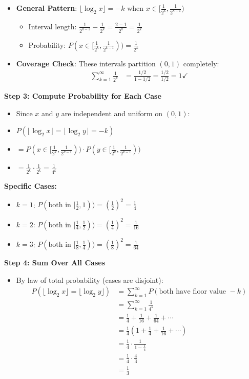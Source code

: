 \documentclass[11pt]{article}
\begin{document}
\begin{solutionbox}
\begin{itemize}
    \item \textbf{General Pattern}: $\lfloor\log_2 x\rfloor = -k$ when $x \in [\frac{1}{2^k}, \frac{1}{2^{k-1}})$ 
    \begin{itemize}
        \item Interval length: $\frac{1}{2^{k-1}} - \frac{1}{2^k} = \frac{2 - 1}{2^k} = \frac{1}{2^k}$
        \item Probability: $P(x \in [\frac{1}{2^k}, \frac{1}{2^{k-1}})) = \frac{1}{2^k}$
    \end{itemize}
    
    \item \textbf{Coverage Check}: These intervals partition $(0,1)$ completely:
    \begin{align*}
    \sum_{k=1}^{\infty} \frac{1}{2^k} &= \frac{1/2}{1-1/2} = \frac{1/2}{1/2} = 1 \checkmark
    \end{align*}
\end{itemize}

\textbf{Step 3: Compute Probability for Each Case}
\begin{itemize}
    \item Since $x$ and $y$ are independent and uniform on $(0,1)$:
    \item $P(\lfloor\log_2 x\rfloor = \lfloor\log_2 y\rfloor = -k)$
    \item $= P(x \in [\frac{1}{2^k}, \frac{1}{2^{k-1}})) \cdot P(y \in [\frac{1}{2^k}, \frac{1}{2^{k-1}}))$
    \item $= \frac{1}{2^k} \cdot \frac{1}{2^k} = \frac{1}{4^k}$
\end{itemize}

\textbf{Specific Cases:}
\begin{itemize}
    \item $k=1$: $P(\text{both in } [\frac{1}{2}, 1)) = (\frac{1}{2})^2 = \frac{1}{4}$
    \item $k=2$: $P(\text{both in } [\frac{1}{4}, \frac{1}{2})) = (\frac{1}{4})^2 = \frac{1}{16}$
    \item $k=3$: $P(\text{both in } [\frac{1}{8}, \frac{1}{4})) = (\frac{1}{8})^2 = \frac{1}{64}$
\end{itemize}

\textbf{Step 4: Sum Over All Cases}
\begin{itemize}
    \item By law of total probability (cases are disjoint):
    \begin{align*}
    P(\lfloor\log_2 x\rfloor = \lfloor\log_2 y\rfloor) &= \sum_{k=1}^{\infty} P(\text{both have floor value } -k)\\
    &= \sum_{k=1}^{\infty} \frac{1}{4^k}\\
    &= \frac{1}{4} + \frac{1}{16} + \frac{1}{64} + \cdots\\
    &= \frac{1}{4}(1 + \frac{1}{4} + \frac{1}{16} + \cdots)\\
    &= \frac{1}{4} \cdot \frac{1}{1-\frac{1}{4}}\\
    &= \frac{1}{4} \cdot \frac{4}{3}\\
    &= \frac{1}{3}
    \end{align*}
\end{itemize}


\end{solutionbox}
\end{document}
